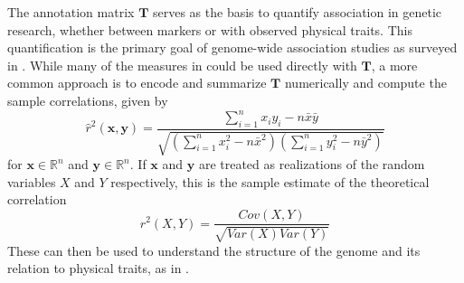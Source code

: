\documentclass{article}
\newcommand{\ve}[1]{\mathbf{#1}}           %
\newcommand{\m}[1]{\mathbf{#1}}               %
\newcommand{\obscorr}{\widehat{r}^2}
\newcommand{\corr}{r^2}
\newcommand{\field}[1]{\mathbb{#1}}
\newcommand{\Reals}{\field{R}}
\begin{document}
The annotation matrix $\m{T}$ serves as the basis to quantify association in genetic research, whether between markers or with observed physical traits. This quantification is the primary goal of genome-wide association studies as surveyed in \cite{uffelmannetal2021gwas, tametal2019benefits, wangetal2005gwas}. While many of the measures in \cite{goodmankruskal1979measures} could be used directly with $\m{T}$, a more common approach is to encode and summarize $\m{T}$ numerically and compute the sample correlations, given by
\begin{equation} \label{eq:sampleCorr}
  \obscorr(\ve{x}, \ve{y}) = \frac{\sum_{i = 1}^n x_i y_i - n \bar{x} \bar{y}}{\sqrt{\left (\sum_{i = 1}^n x_i^2 - n \bar{x}^2 \right ) \left (\sum_{i = 1}^n y_i^2 - n \bar{y}^2 \right )}}
\end{equation}
for $\ve{x} \in \Reals^n$ and $\ve{y} \in \Reals^n$. If $\ve{x}$ and $\ve{y}$ are treated as realizations of the random variables $X$ and $Y$ respectively, this is the sample estimate of the theoretical correlation
\begin{equation} \label{eq:theorCorr}
 \corr(X, Y) = \frac{Cov(X, Y)}{\sqrt{Var(X) Var(Y)}}
\end{equation}
These can then be used to understand the structure of the genome and its relation to physical traits, as in \cite{poolr, LiJi2005, nyholt2004, cheverudetal2001}.
\end{document}
